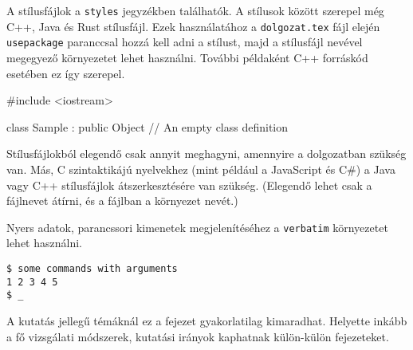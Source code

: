 A stílusfájlok a \texttt{styles} jegyzékben találhatók.
A stílusok között szerepel még C++, Java és Rust stílusfájl.
Ezek használatához a \texttt{dolgozat.tex} fájl elején \texttt{usepackage} paranccsal hozzá kell adni a stílust, majd a stílusfájl nevével megegyező környezetet lehet használni.
További példaként C++ forráskód esetében ez így szerepel.
\begin{cpp}
#include <iostream>

class Sample : public Object
{
    // An empty class definition
}
\end{cpp}
Stílusfájlokból elegendő csak annyit meghagyni, amennyire a dolgozatban szükség van.
Más, C szintaktikájú nyelvekhez (mint például a JavaScript és C\#) a Java vagy C++ stílusfájlok átszerkesztésére van szükség.
(Elegendő lehet csak a fájlnevet átírni, és a fájlban a környezet nevét.)

Nyers adatok, parancssori kimenetek megjelenítéséhez a \texttt{verbatim} környezetet lehet használni.
\begin{verbatim}
$ some commands with arguments
1 2 3 4 5
$ _
\end{verbatim}

A kutatás jellegű témáknál ez a fejezet gyakorlatilag kimaradhat.
Helyette inkább a fő vizsgálati módszerek, kutatási irányok kaphatnak külön-külön fejezeteket.
